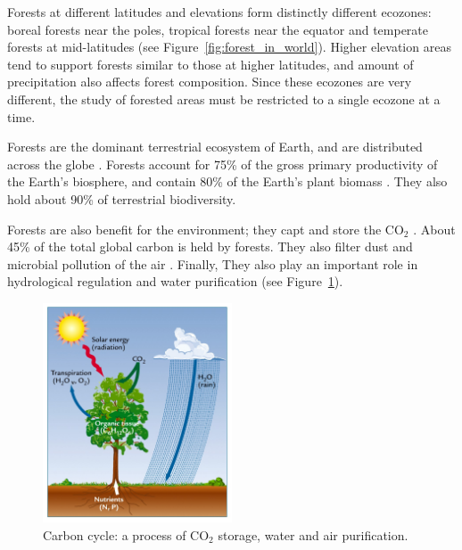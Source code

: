 Forests at different latitudes and elevations form distinctly different ecozones: boreal forests near the poles, tropical forests near the equator and temperate forests at mid-latitudes (see Figure~\ref{fig:forest_in_world}). Higher elevation areas tend to support forests similar to those at higher latitudes, and amount of precipitation also affects forest composition. Since these ecozones are very different, the study of forested areas must be restricted to a single ecozone at a time.

Forests are the dominant terrestrial ecosystem of Earth, and are distributed across the globe \citep{pan2013structure}. Forests account for 75\% of the gross primary productivity of the Earth's biosphere, and contain 80\% of the Earth's plant biomass \citep{pan2013structure}. They also hold about 90\% of terrestrial biodiversity.

Forests are also benefit for the environment; they capt and store the CO$_{2}$ \citep{fahey2010forest}. About 45\% of the total global carbon is held by forests. They also filter dust and microbial pollution of the air \citep{smith2012air}. Finally, They also play an important role in hydrological regulation and water purification \citep{lempriere2008importance} (see Figure~\ref{fig:carbon_cycle}).

\begin{figure}[htbp]
\begin{center}
\includegraphics[width=0.5\textwidth]{Figures/carbon_cycle}
\caption{Carbon cycle: a process of CO$_{2}$ storage, water and air purification.}
\label{fig:carbon_cycle}
\end{center}
\end{figure}


